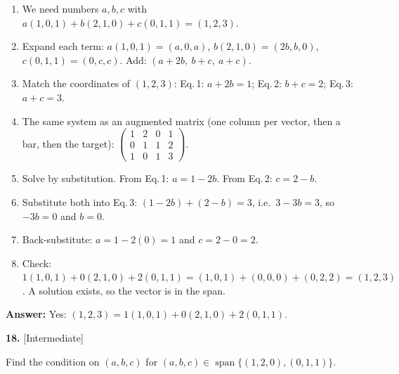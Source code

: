 \documentclass[11pt]{article}
\begin{document}
\begin{tcolorbox}[breakable,colback=ans,colframe=ansb,boxrule=0.5pt,left=4pt,right=4pt,top=2pt,bottom=2pt]\begin{enumerate}[leftmargin=2.2em,itemsep=1pt,topsep=1pt,label=\textbf{Step \arabic*.}]\item We need numbers $a,b,c$ with $a(1,0,1)+b(2,1,0)+c(0,1,1)=(1,2,3)$.
\item Expand each term: $a(1,0,1)=(a,0,a)$, $b(2,1,0)=(2b,b,0)$, $c(0,1,1)=(0,c,c)$. Add: $(a+2b,\ b+c,\ a+c)$.
\item Match the coordinates of $(1,2,3)$: Eq.\,1: $a+2b=1$; Eq.\,2: $b+c=2$; Eq.\,3: $a+c=3$.
\item The same system as an augmented matrix (one column per vector, then a bar, then the target): $\left(\begin{array}{ccc|c}1&2&0&1\\0&1&1&2\\1&0&1&3\end{array}\right)$.
\item Solve by substitution. From Eq.\,1: $a=1-2b$. From Eq.\,2: $c=2-b$.
\item Substitute both into Eq.\,3: $(1-2b)+(2-b)=3$, i.e.\ $3-3b=3$, so $-3b=0$ and $b=0$.
\item Back-substitute: $a=1-2(0)=1$ and $c=2-0=2$.
\item Check: $1(1,0,1)+0(2,1,0)+2(0,1,1)=(1,0,1)+(0,0,0)+(0,2,2)=(1,2,3)$ \checkmark. A solution exists, so the vector is in the span.
\end{enumerate}\textbf{Answer:} Yes: $(1,2,3)=1(1,0,1)+0(2,1,0)+2(0,1,1)$.\end{tcolorbox}
\par\vspace{2pt}
\begin{minipage}{\linewidth}\textbf{18.} \hfill{\scriptsize\color{ink}[Intermediate]}\par\nopagebreak Find the condition on $(a,b,c)$ for $(a,b,c)\in\operatorname{span}\{(1,2,0),(0,1,1)\}$.
\end{minipage}\par\nopagebreak
\end{document}
